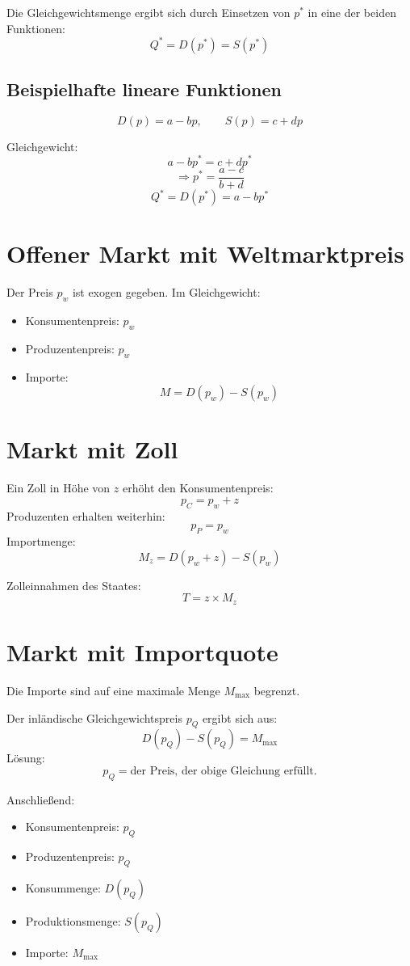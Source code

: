 Die Gleichgewichtsmenge ergibt sich durch Einsetzen von \( p^* \) in eine der beiden Funktionen:
\[
Q^* = D(p^*) = S(p^*)
\]

\subsection*{Beispielhafte lineare Funktionen}
\[
D(p) = a - b p, \qquad S(p) = c + d p
\]

Gleichgewicht:
\[
a - b p^* = c + d p^*
\]
\[
\Rightarrow p^* = \frac{a - c}{b + d}
\]
\[
Q^* = D(p^*) = a - b p^*
\]

\section{Offener Markt mit Weltmarktpreis}

Der Preis \( p_w \) ist exogen gegeben.
Im Gleichgewicht:
\begin{itemize}
    \item Konsumentenpreis: \( p_w \)
    \item Produzentenpreis: \( p_w \)
    \item Importe:
    \[
    M = D(p_w) - S(p_w)
    \]
\end{itemize}

\section{Markt mit Zoll}

Ein Zoll in Höhe von \( z \) erhöht den Konsumentenpreis:
\[
p_C = p_w + z
\]
Produzenten erhalten weiterhin:
\[
p_P = p_w
\]
Importmenge:
\[
M_z = D(p_w + z) - S(p_w)
\]

Zolleinnahmen des Staates:
\[
T = z \times M_z
\]

\section{Markt mit Importquote}

Die Importe sind auf eine maximale Menge \( M_{\text{max}} \) begrenzt.

Der inländische Gleichgewichtspreis \( p_Q \) ergibt sich aus:
\[
D(p_Q) - S(p_Q) = M_{\text{max}}
\]
Lösung:
\[
p_Q = \text{der Preis, der obige Gleichung erfüllt.}
\]

Anschließend:
\begin{itemize}
    \item Konsumentenpreis: \( p_Q \)
    \item Produzentenpreis: \( p_Q \)
    \item Konsummenge: \( D(p_Q) \)
    \item Produktionsmenge: \( S(p_Q) \)
    \item Importe: \( M_{\text{max}} \)
\end{itemize}

